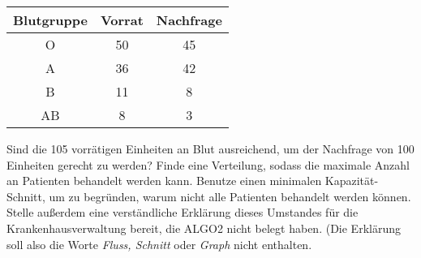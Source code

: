 \documentclass{uebung_cs}
\begin{document}
\begin{aufgabe}[Blutspende]
\begin{enumerate}
    	\vspace{4mm}
    	\begin{center}
    	\begin{tabular}{|c|c|c|}
    	\hline 
    	Blutgruppe & Vorrat & Nachfrage \\ 
    	\hline 
    	O & 50 & 45 \\ 
    	\hline 
    	A & 36 & 42 \\ 
    	\hline 
    	B & 11 & 8 \\ 
    	\hline 
    	AB & 8 & 3 \\ 
    	\hline 
    	\end{tabular}
    	\end{center}
    	\vspace{4mm}
    	Sind die 105 vorrätigen Einheiten an Blut ausreichend, um der Nachfrage von 100 Einheiten gerecht zu werden? Finde eine Verteilung, sodass die maximale Anzahl an Patienten behandelt werden kann. Benutze einen minimalen Kapazität-Schnitt, um zu begründen, warum nicht alle Patienten behandelt werden können. Stelle außerdem eine verständliche Erklärung dieses Umstandes für die Krankenhausverwaltung bereit, die ALGO2 nicht belegt haben. (Die Erklärung soll also die Worte \textit{Fluss, Schnitt} oder \textit{Graph} nicht enthalten.
    \end{enumerate}
\end{aufgabe}
\end{document}
